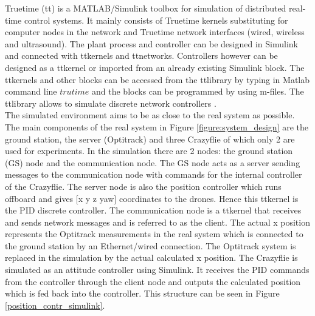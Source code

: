Truetime (tt) is a MATLAB/Simulink toolbox for simulation of distributed real-time control systems. It mainly consists of Truetime kernels substituting for computer nodes in the network and Truetime network interfaces (wired, wireless and ultrasound). The plant process and controller can be designed in Simulink and connected with ttkernels and ttnetworks. Controllers however can be designed as a ttkernel or imported from an already existing Simulink block.
The ttkernels and other blocks can be accessed from the ttlibrary by typing in Matlab command line $trutime$ and the blocks can be programmed by using m-files. The ttlibrary allows to simulate discrete network controllers \cite{chvostek2007simulation}.\\

The simulated environment aims to be as close to the real system as possible. The main components of the real system in Figure \ref{figure:system_design} are the ground station, the server (Optitrack) and three Crazyflie of which only 2 are used for experiments. In the simulation there are 2 nodes: the ground station (GS) node and the communication node. The GS node acts as a server sending messages to the communication node with commands for the internal controller of the Crazyflie. The server node is also the position controller which runs offboard and gives [x y z yaw] coordinates to the drones. Hence this ttkernel is the PID discrete controller. The communication node is a ttkernel that receives and sends network messages and is referred to as the client. The actual x position represents the Optitrack measurements in the real system which is connected to the ground station by an Ethernet/wired connection. The Optitrack system is replaced in the simulation by the actual calculated x position. The Crazyflie is simulated as an attitude controller using Simulink. It receives the PID commands from the controller through the client node and outputs the calculated position which is fed back into the controller. This structure can be seen in Figure \ref{position_contr_simulink}.\\

